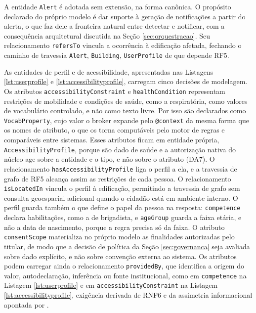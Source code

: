 A entidade \texttt{Alert} é adotada sem extensão, na forma canônica. O propósito declarado do próprio modelo é dar suporte à geração de notificações a partir do alerta, o que faz dele a fronteira natural entre detectar e notificar, com a consequência arquitetural discutida na Seção \ref{sec:orquestracao}. Seu relacionamento \texttt{refersTo} vincula a ocorrência à edificação afetada, fechando o caminho de travessia \texttt{Alert}, \texttt{Building}, \texttt{UserProfile} de que depende RF5.

{\setlength{\emergencystretch}{2.5em}%
As entidades de perfil e de acessibilidade, apresentadas nas Listagens \ref{lst:userprofile} e \ref{lst:accessibilityprofile}, carregam cinco decisões de modelagem. Os atributos \texttt{accessibilityConstraint} e \texttt{healthCondition} representam restrições de mobilidade e condições de saúde, como a respiratória, como valores de vocabulário controlado, e não como texto livre. Por isso são declarados como \texttt{VocabProperty}, cujo valor o broker expande pelo \texttt{@context} da mesma forma que os nomes de atributo, o que os torna computáveis pelo motor de regras e comparáveis entre sistemas. Esses atributos ficam em entidade própria, \texttt{AccessibilityProfile}, porque são dado de saúde e a autorização nativa do núcleo age sobre a entidade e o tipo, e não sobre o atributo (DA7). O relacionamento \texttt{hasAccessibilityProfile} liga o perfil a ela, e a travessia de grafo de RF5 alcança assim as restrições de cada pessoa. O relacionamento \texttt{isLocatedIn} vincula o perfil à edificação, permitindo a travessia de grafo sem consulta geoespacial adicional quando o cidadão está em ambiente interno. O perfil guarda também o que define o papel da pessoa na resposta: \texttt{competence} declara habilitações, como a de brigadista, e \texttt{ageGroup} guarda a faixa etária, e não a data de nascimento, porque a regra precisa só da faixa. O atributo \texttt{consentScope} materializa no próprio modelo as finalidades autorizadas pelo titular, de modo que a decisão de política da Seção \ref{sec:governanca} seja avaliada sobre dado explícito, e não sobre convenção externa ao sistema. Os atributos podem carregar ainda o relacionamento \texttt{providedBy}, que identifica a origem do valor, autodeclaração, inferência ou fonte institucional, como em \texttt{competence} na Listagem \ref{lst:userprofile} e em \texttt{accessibilityConstraint} na Listagem \ref{lst:accessibilityprofile}, exigência derivada de RNF6 e da assimetria informacional apontada por .\par}

